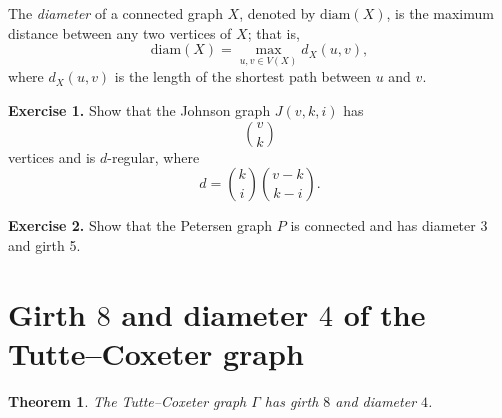 \documentclass[12pt,a4paper,openany]{book}
\newtheorem{theorem}{Theorem}[section]
\begin{document}
\medskip
\noindent
The \emph{diameter} of a connected graph \(X\), denoted by \(\mathrm{diam}(X)\), 
is the maximum distance between any two vertices of \(X\); that is,
\[
\mathrm{diam}(X) = \max_{u,v \in V(X)} d_X(u,v),
\]
where \(d_X(u,v)\) is the length of the shortest path between \(u\) and \(v\).


\bigskip
\noindent\textbf{Exercise 1.} 
Show that the Johnson graph $J(v,k,i)$ has 
\[
\binom{v}{k} 
\] 
vertices and is $d$-regular, where
\[
d = \binom{k}{i} \binom{v-k}{k-i}.
\]

\bigskip
\noindent\textbf{Exercise 2.} 
Show that  the Petersen graph $P$  is connected and has diameter 3 and girth 5.


\section*{Girth $8$ and diameter $4$ of the Tutte--Coxeter graph}



\begin{theorem}
The Tutte--Coxeter graph $\Gamma$ has girth $8$ and diameter $4$.
\end{theorem}
\end{document}
